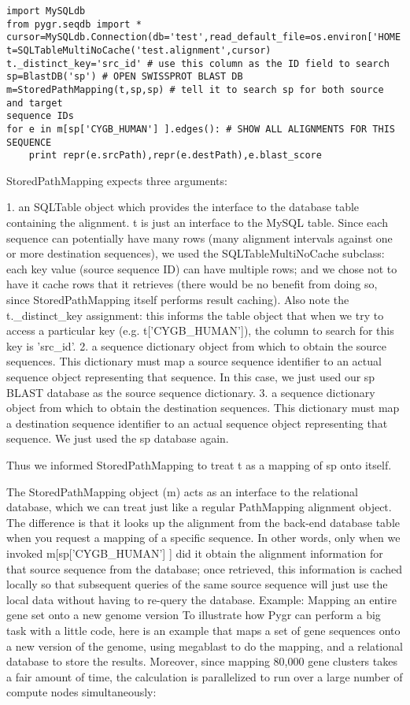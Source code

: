 \documentclass{howto}
\begin{document}
\begin{verbatim}
import MySQLdb
from pygr.seqdb import *
cursor=MySQLdb.Connection(db='test',read_default_file=os.environ['HOME']+'/.my.cnf').cursor()
t=SQLTableMultiNoCache('test.alignment',cursor)
t._distinct_key='src_id' # use this column as the ID field to search
sp=BlastDB('sp') # OPEN SWISSPROT BLAST DB
m=StoredPathMapping(t,sp,sp) # tell it to search sp for both source and target 
sequence IDs
for e in m[sp['CYGB_HUMAN'] ].edges(): # SHOW ALL ALIGNMENTS FOR THIS SEQUENCE
    print repr(e.srcPath),repr(e.destPath),e.blast_score
\end{verbatim}

StoredPathMapping expects three arguments:

   1. an SQLTable object which provides the interface to the database table containing the alignment.  t is just an interface to the MySQL table.  Since each sequence can potentially have many rows (many alignment intervals against one or more destination sequences), we used the SQLTableMultiNoCache subclass: each key value (source sequence ID) can have multiple rows; and we chose not to have it cache rows that it retrieves (there would be no benefit from doing so, since StoredPathMapping itself performs result caching).  Also note the t._distinct_key assignment: this informs the table object that when we try to access a particular key (e.g. t['CYGB_HUMAN']), the column to search for this key is 'src_id'.
   2. a sequence dictionary object from which to obtain the source sequences.  This dictionary must map a source sequence identifier to an actual sequence object representing that sequence.  In this case, we just used our sp BLAST database as the source sequence dictionary.
   3. a sequence dictionary object from which to obtain the destination sequences.  This dictionary must map a destination sequence identifier to an actual sequence object representing that sequence.  We just used the sp database again.

Thus we informed StoredPathMapping to treat t as a mapping of sp onto itself.

The StoredPathMapping object (m) acts as an interface to the relational database, which we can treat just like a regular PathMapping alignment object.  The difference is that it looks up the alignment from the back-end database table when you request a mapping of a specific sequence.  In other words, only when we invoked m[sp['CYGB_HUMAN'] ] did it obtain the alignment information for that source sequence from the database; once retrieved, this information is cached locally so that subsequent queries of the same source sequence will just use the local data without having to re-query the database.
Example: Mapping an entire gene set onto a new genome version
To illustrate how Pygr can perform a big task with a little code, here is an example that maps a set of gene sequences onto a new version of the genome, using megablast to do the mapping, and a relational database to store the results.  Moreover, since mapping 80,000 gene clusters takes a fair amount of time, the calculation is parallelized to run over a large number of compute nodes simultaneously:
\end{document}
